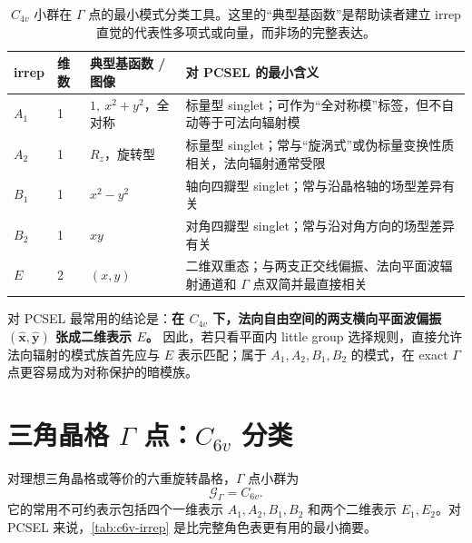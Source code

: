 \begin{table}[htbp]
  \centering
  \footnotesize
  \caption{$C_{4v}$ 小群在 $\Gamma$ 点的最小模式分类工具。这里的“典型基函数”是帮助读者建立 irrep 直觉的代表性多项式或向量，而非场的完整表达。}
  \label{tab:c4v-irrep}
  \setlength{\tabcolsep}{4pt}
  \begin{tabularx}{\textwidth}{@{}p{1.2cm}p{1.0cm}p{2.5cm}Y@{}}
    \toprule
    irrep & 维数 & 典型基函数 / 图像 & 对 PCSEL 的最小含义 \\
    \midrule
    $A_1$ & 1 & $1,\ x^2+y^2$，全对称 & 标量型 singlet；可作为“全对称模”标签，但不自动等于可法向辐射模 \\
    $A_2$ & 1 & $R_z$，旋转型 & 标量型 singlet；常与“旋涡式”或伪标量变换性质相关，法向辐射通常受限 \\
    $B_1$ & 1 & $x^2-y^2$ & 轴向四瓣型 singlet；常与沿晶格轴的场型差异有关 \\
    $B_2$ & 1 & $xy$ & 对角四瓣型 singlet；常与沿对角方向的场型差异有关 \\
    $E$ & 2 & $(x,y)$ & 二维双重态；与两支正交线偏振、法向平面波辐射通道和 $\Gamma$ 点双简并最直接相关 \\
    \bottomrule
  \end{tabularx}
\end{table}

对 PCSEL 最常用的结论是：\textbf{在 $C_{4v}$ 下，法向自由空间的两支横向平面波偏振 $(\hat{\bm x},\hat{\bm y})$ 张成二维表示 $E$。} 因此，若只看平面内 little group 选择规则，直接允许法向辐射的模式族首先应与 $E$ 表示匹配；属于 $A_1,A_2,B_1,B_2$ 的模式，在 exact $\Gamma$ 点更容易成为对称保护的暗模族。

\section{三角晶格 \texorpdfstring{$\Gamma$}{Gamma} 点：\texorpdfstring{$C_{6v}$}{C6v} 分类}
对理想三角晶格或等价的六重旋转晶格，$\Gamma$ 点小群为
\[
\mathcal{G}_{\Gamma}=C_{6v}.
\]
它的常用不可约表示包括四个一维表示 $A_1,A_2,B_1,B_2$ 和两个二维表示 $E_1,E_2$。对 PCSEL 来说，\cref{tab:c6v-irrep} 是比完整角色表更有用的最小摘要。

